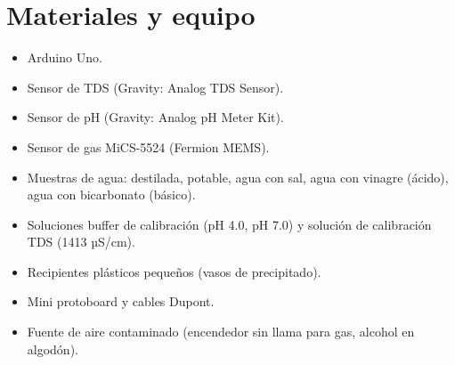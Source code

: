 \section*{Materiales y equipo}
\begin{itemize}
    \item Arduino Uno.
    \item Sensor de TDS (Gravity: Analog TDS Sensor).
    \item Sensor de pH (Gravity: Analog pH Meter Kit).
    \item Sensor de gas MiCS-5524 (Fermion MEMS).
    \item Muestras de agua: destilada, potable, agua con sal, agua con vinagre (ácido), agua con bicarbonato (básico).
    \item Soluciones buffer de calibración (pH 4.0, pH 7.0) y solución de calibración TDS (1413 µS/cm).
    \item Recipientes plásticos pequeños (vasos de precipitado).
    \item Mini protoboard y cables Dupont.
    \item Fuente de aire contaminado (encendedor sin llama para gas, alcohol en algodón).
\end{itemize}


